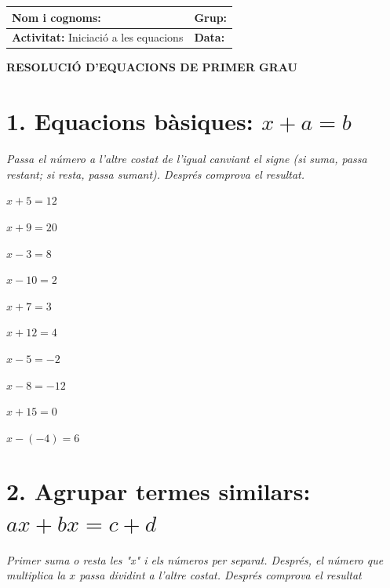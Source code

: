 \documentclass[12pt,a4paper]{article}
\begin{document}
\begingroup
\renewcommand{\arraystretch}{2.2}
\begin{tabularx}{\textwidth}{|X|p{4cm}|}
    \hline
    \textbf{Nom i cognoms:} & \textbf{Grup:} \\ \hline
    \textbf{Activitat:} Iniciació a les equacions & \textbf{Data:} \\ \hline
\end{tabularx}
\endgroup

\vspace{0.8cm}

\begin{center}
    {\Large \textbf{RESOLUCIÓ D'EQUACIONS DE PRIMER GRAU}}
\end{center}

\vspace{0.5cm}

\section*{1. Equacions bàsiques: $x + a = b$}
\textit{Passa el número a l'altre costat de l'igual canviant el signe (si suma, passa restant; si resta, passa sumant). Després comprova el resultat.}

\begin{enumerate}[label=\alph*), itemsep=1ex]
    \begin{minipage}[t]{0.45\textwidth}
        \item $x + 5 = 12$
        \item $x + 9 = 20$
        \item $x - 3 = 8$
        \item $x - 10 = 2$
        \item $x + 7 = 3$
    \end{minipage}
    \begin{minipage}[t]{0.45\textwidth}
        \item $x + 12 = 4$
        \item $x - 5 = -2$
        \item $x - 8 = -12$
        \item $x + 15 = 0$
        \item $x - (-4) = 6$
    \end{minipage}
\end{enumerate}

\vspace{0.8cm}

\section*{2. Agrupar termes similars: $ax + bx = c + d$}
\textit{Primer suma o resta les "x" i els números per separat. Després, el número que multiplica la $x$ passa dividint a l'altre costat. Després comprova el resultat}
\end{document}
